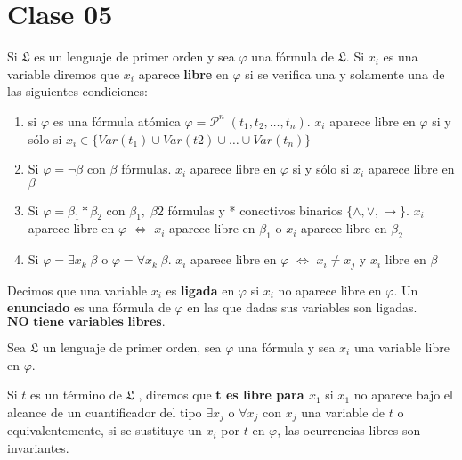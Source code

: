 \section{Clase 05}

\begin{definition}

Si $\mathfrak{L}$ es un lenguaje de primer orden y sea $\varphi$ una f\'ormula de $\mathfrak{L}$. Si $x_i$ es una variable diremos que $x_i$ aparece \textbf{libre} en $\varphi$ si se verifica una y solamente una de las siguientes condiciones:

\begin{enumerate}
	\item si $\varphi$ es una f\'ormula at\'omica $\varphi = \mathcal{P}^n\;(t_1, t_2, \ldots, t_n)$. $x_i$ aparece libre en $\varphi$ si y s\'olo si $x_i \in \{Var(t_1) \cup Var(t2) \cup \ldots \cup Var(t_n) \}$
	\item Si $\varphi = \neg \beta$ con $\beta$ f\'ormulas. $x_i$ aparece libre en $\varphi$ si y s\'olo si $x_i$ aparece libre en $\beta$
	\item Si $\varphi = \beta_1 * \beta_2$ con $\beta_1, \; \beta2$ f\'ormulas y * conectivos binarios $\{ \land, \lor, \rightarrow \}$. $x_i$ aparece libre en $\varphi$ $\iff$ $x_i$ aparece libre en $\beta_1$ o $x_i$ aparece libre en $\beta_2$
	\item Si $\varphi = \exists x_k \; \beta$ o $\varphi = \forall x_k \; \beta$. $x_i$ aparece libre en $\varphi$ $\iff$ $x_i \neq x_j$ y $x_i$ libre en $\beta$	
\end{enumerate}

\end{definition}

\begin{definition}

Decimos que una variable $x_i$ es \textbf{ligada} en $\varphi$ si $x_i$ no aparece libre en $\varphi$. Un \textbf{enunciado} es una f\'ormula de $\varphi$ en las que dadas sus variables son ligadas. $\textbf{NO tiene variables libres.}$

\end{definition}

\begin{definition}

Sea $\mathfrak{L}$  un lenguaje de primer orden, sea $\varphi$ una f\'ormula y sea $x_i$ una variable libre en $\varphi$.

Si $t$ es un t\'ermino de $\mathfrak{L}$ , diremos que \textbf{t es libre para $x_1$} si $x_1$ no aparece bajo el alcance de un cuantificador del tipo $\exists x_j$ o $\forall x_j$ con $x_j$ una variable de $t$  o equivalentemente, si se sustituye un $x_i$ por $t$ en $\varphi$, las ocurrencias libres son invariantes.

\end{definition}

